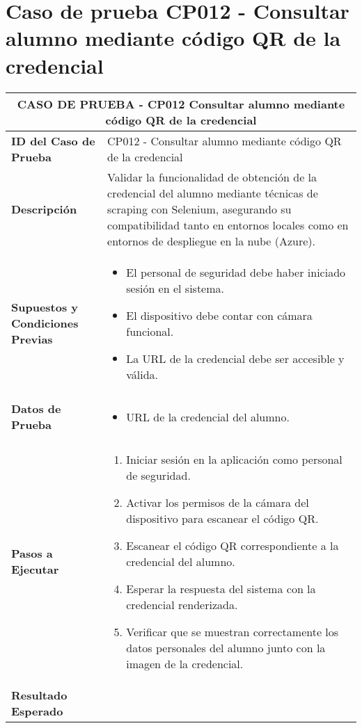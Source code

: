 
\section{Caso de prueba CP012 - Consultar alumno mediante código QR de la credencial}

\begin{longtable}{|p{5cm}|p{10cm}|}
	\hline
	\multicolumn{2}{|c|}{\textbf{CASO DE PRUEBA - CP012 Consultar alumno mediante código QR de la credencial}} \\
	\hline
	\textbf{ID del Caso de Prueba} & CP012 - Consultar alumno mediante código QR de la credencial \\
	\hline
	\textbf{Descripción} & Validar la funcionalidad de obtención de la credencial del alumno mediante técnicas de scraping con Selenium, asegurando su compatibilidad tanto en entornos locales como en entornos de despliegue en la nube (Azure). \\
	\hline
	\textbf{Supuestos y Condiciones Previas} & 
	\begin{itemize}
		\item El personal de seguridad debe haber iniciado sesión en el sistema.
		\item El dispositivo debe contar con cámara funcional.
		\item La URL de la credencial debe ser accesible y válida.
	\end{itemize} \\
	\hline
	\textbf{Datos de Prueba} & 
	\begin{itemize}
		\item URL de la credencial del alumno.
	\end{itemize} \\
	\hline
	\textbf{Pasos a Ejecutar} & 
	\begin{enumerate}
		\item Iniciar sesión en la aplicación como personal de seguridad.
		\item Activar los permisos de la cámara del dispositivo para escanear el código QR.
		\item Escanear el código QR correspondiente a la credencial del alumno.
		\item Esperar la respuesta del sistema con la credencial renderizada.
		\item Verificar que se muestran correctamente los datos personales del alumno junto con la imagen de la credencial.
	\end{enumerate} \\
	\hline
	\textbf{Resultado Esperado} & 

\end{longtable}
